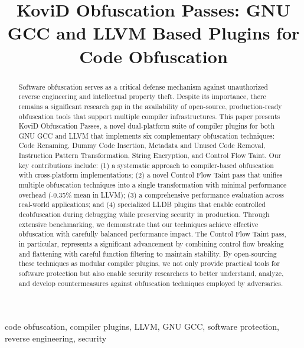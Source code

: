 \documentclass[conference]{IEEEtran}
\begin{document}
\title{KoviD Obfuscation Passes: GNU GCC and LLVM Based Plugins for Code Obfuscation}

\author{
}

\maketitle

\begin{abstract}
Software obfuscation serves as a critical defense mechanism against unauthorized reverse engineering and intellectual property theft. Despite its importance, there remains a significant research gap in the availability of open-source, production-ready obfuscation tools that support multiple compiler infrastructures. This paper presents KoviD Obfuscation Passes, a novel dual-platform suite of compiler plugins for both GNU GCC and LLVM that implements six complementary obfuscation techniques: Code Renaming, Dummy Code Insertion, Metadata and Unused Code Removal, Instruction Pattern Transformation, String Encryption, and Control Flow Taint. Our key contributions include: (1) a systematic approach to compiler-based obfuscation with cross-platform implementations; (2) a novel Control Flow Taint pass that unifies multiple obfuscation techniques into a single transformation with minimal performance overhead (-0.35\% mean in LLVM); (3) a comprehensive performance evaluation across real-world applications; and (4) specialized LLDB plugins that enable controlled deobfuscation during debugging while preserving security in production. Through extensive benchmarking, we demonstrate that our techniques achieve effective obfuscation with carefully balanced performance impact. The Control Flow Taint pass, in particular, represents a significant advancement by combining control flow breaking and flattening with careful function filtering to maintain stability. By open-sourcing these techniques as modular compiler plugins, we not only provide practical tools for software protection but also enable security researchers to better understand, analyze, and develop countermeasures against obfuscation techniques employed by adversaries.
\end{abstract}

\begin{IEEEkeywords}
code obfuscation, compiler plugins, LLVM, GNU GCC, software protection, reverse engineering, security
\end{IEEEkeywords}
\end{document}
